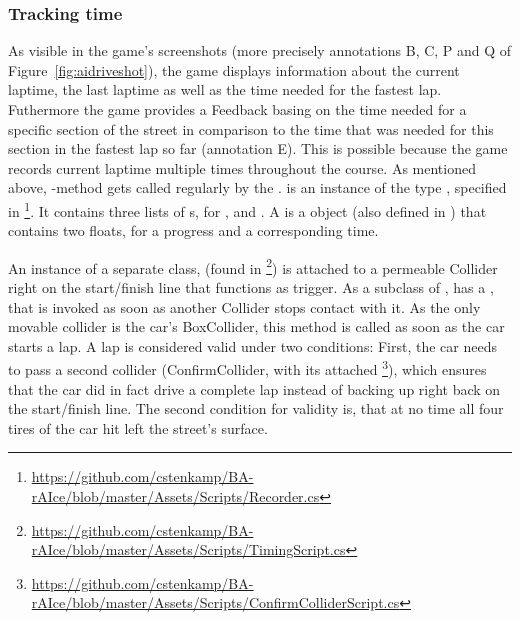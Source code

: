 \subsubsection{Tracking time}

As visible in the game's screenshots (more precisely annotations B, C, P and Q of Figure~\ref{fig:aidriveshot}), the game displays information about the current laptime, the last laptime as well as the time needed for the fastest lap. Futhermore the game provides a Feedback basing on the time needed for a specific section of the street in comparison to the time that was needed for this section in the fastest lap so far (annotation E). This is possible because the game records current laptime multiple times throughout the course. As mentioned above, -method gets called regularly by the .  is an instance of the type , specified in \footnote{\url{https://github.com/cstenkamp/BA-rAIce/blob/master/Assets/Scripts/Recorder.cs}}\byLeon. It contains three lists of s, for ,  and . A  is a  object (also defined in ) that contains two floats, for a progress and a corresponding time.

An instance of a separate class,  (found in \footnote{\url{https://github.com/cstenkamp/BA-rAIce/blob/master/Assets/Scripts/TimingScript.cs}}\byLeon) is attached to a permeable Collider right on the start/finish line that functions as trigger. As a subclass of ,  has a , that is invoked as soon as another Collider stops contact with it. As the only movable collider is the car's BoxCollider, this method is called as soon as the car starts a lap. A lap is considered valid under two conditions: First, the car needs to pass a second collider (ConfirmCollider, with its attached \footnote{\url{https://github.com/cstenkamp/BA-rAIce/blob/master/Assets/Scripts/ConfirmColliderScript.cs}}\byLeon), which ensures that the car did in fact drive a complete lap instead of backing up right back on the start/finish line. The second condition for validity is, that at no time all four tires of the car hit left the street's surface.

